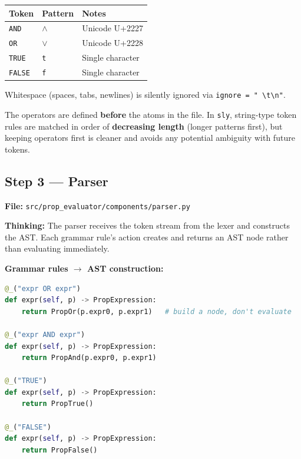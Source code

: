 \documentclass[12pt,a4paper]{article}
\begin{document}
\begin{center}
\begin{tabular}{lll}
\toprule
Token & Pattern & Notes \\
\midrule
\texttt{AND} & $\land$ & Unicode U+2227 \\
\texttt{OR} & $\lor$ & Unicode U+2228 \\
\texttt{TRUE} & \texttt{t} & Single character \\
\texttt{FALSE} & \texttt{f} & Single character \\
\bottomrule
\end{tabular}
\end{center}

Whitespace (spaces, tabs, newlines) is silently ignored via \texttt{ignore = " \textbackslash t\textbackslash n"}.

The operators are defined \textbf{before} the atoms in the file. In \texttt{sly},
string-type token rules are matched in order of \textbf{decreasing length} (longer
patterns first), but keeping operators first is cleaner and avoids any potential
ambiguity with future tokens.


\subsection{Step 3 --- Parser}

\textbf{File:} \texttt{src/prop\_evaluator/components/parser.py}

\textbf{Thinking:} The parser receives the token stream from the lexer and constructs
the AST. Each grammar rule's action creates and returns an AST node rather than
evaluating immediately.

\textbf{Grammar rules $\rightarrow$ AST construction:}

\begin{lstlisting}[language=Python]
@_("expr OR expr")
def expr(self, p) -> PropExpression:
    return PropOr(p.expr0, p.expr1)   # build a node, don't evaluate

@_("expr AND expr")
def expr(self, p) -> PropExpression:
    return PropAnd(p.expr0, p.expr1)

@_("TRUE")
def expr(self, p) -> PropExpression:
    return PropTrue()

@_("FALSE")
def expr(self, p) -> PropExpression:
    return PropFalse()
\end{lstlisting}
\end{document}
